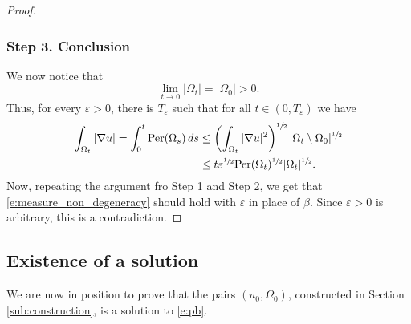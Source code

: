 \documentclass[JEP,XML,SOM,Unicode]{cedram}
\newcommand{\Per}{\mathrm{Per}}
\theoremstyle{plain}
\theoremstyle{definition}
\let\eps\varepsilon
\begin{document}
\begin{proof}
\subsubsection*{Step 3. Conclusion} We now notice that
\[\lim_{t\to0}|\Omega_t|=|\Omega_0|>0.\]
Thus, for every $\eps>0$, there is $T_\eps$ such that for all $t\in(0,T_\eps)$ we have
\begin{equation}
\begin{split}
\int_{\Omega_t}|\nabla u|=\int_0^t\Per(\Omega_s)\,ds&\le \left(\int_{\Omega_t}|\nabla u|^2\right)^{\sfrac12}|\Omega_t\setminus\Omega_0|^{\sfrac12}\\
&\le t\eps ^{\sfrac12}\Per(\Omega_t)^{\sfrac12}|\Omega_t|^{\sfrac12}.
\end{split}
\end{equation}
Now, repeating the argument fro Step 1 and Step 2, we get that \eqref{e:measure_non_degeneracy} should hold with $\eps$ in place of $\beta$. Since $\eps>0$ is arbitrary, this is a contradiction.
\end{proof}

\subsection{Existence of a solution}
We are now in position to prove that the pairs $(u_0,\Omega_0)$, constructed in Section \ref{sub:construction}, is a solution to \eqref{e:pb}.
\end{document}
